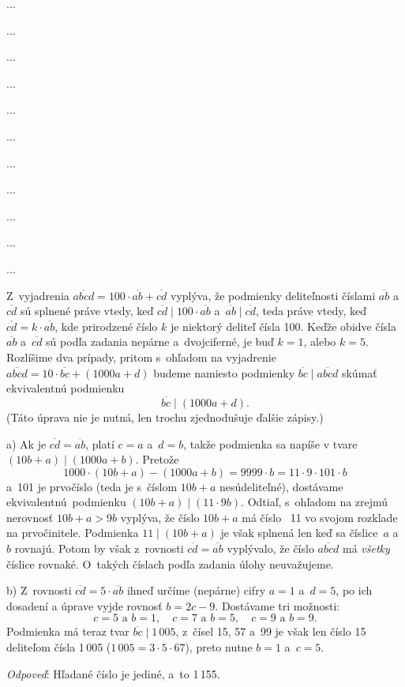 {%
...}

{%
...}

{%
...}

{%
...}

{%
...}

{%
...}

{%
...}

{%
...}

{%
...}

{%
...}

{%
...}

{%
\def\ov{\overline}%
Z~vyjadrenia
$\ov{abcd}=100\cdot\ov{ab}+\ov{cd}$ vyplýva, že podmienky deliteľnosti
číslami $\ov{ab}$ a~$\ov{cd}$ sú
splnené práve vtedy, keď $\ov{cd}\mid100\cdot\ov{ab}$
a~$\ov{ab}\mid\ov{cd}$, teda práve vtedy, keď $\ov{cd}=k\cdot \ov{ab}$,
kde prirodzené číslo $k$ je niektorý deliteľ čísla 100.
Keďže obidve čísla $\ov{ab}$ a~$\ov{cd}$ sú podľa zadania
nepárne a~dvojciferné,
je buď $k=1$, alebo $k=5$. Rozlíšime dva prípady, pritom
s~ohľadom na vyjadrenie $\ov{abcd}=10\cdot\ov{bc}+(1000a+d)$
budeme namiesto podmienky $\ov{bc}\mid\ov{abcd}$ skúmať
ekvivalentnú pod\-mien\-ku
$$
\ov{bc}\mid(1000a+d).  \tag{$\ast$}
$$
(Táto úprava nie je nutná, len trochu zjednodušuje ďalšie zápisy.)

a) Ak je $\ov{cd}=\ov{ab}$, platí $c=a$ a~$d=b$, takže podmienka
\thetag{$\ast$}
sa napíše v tvare $(10b+a)\mid(1000a+b)$. Pretože
$$
1000\cdot(10b+a)-(1000a+b)=9999\cdot b=11\cdot9\cdot101\cdot b
$$
a~101 je prvočíslo (teda je s~číslom $10b+a$ nesúdeliteľné),
dostávame ekvivalentnú~podmienku $(10b+a)\mid(11\cdot9b)$.
Odtiaľ, s~ohľadom na zrejmú nerovnosť $10b+a>9b$ vyplýva,
že číslo $10b+a$ má číslo~ 11 vo svojom rozklade na prvočinitele.
Podmienka $11\mid(10b+a)$ je však splnená
len keď sa číslice~$a$ a~$b$ rovnajú. Potom by však
z~rovnosti  $\ov{cd}=\ov{ab}$ vyplývalo, že číslo $\ov{abcd}$
má {\it všetky\/} číslice rovnaké. O~takých číslach podľa zadania
úlohy neuvažujeme.

b) Z~rovnosti $\ov{cd}=5\cdot\ov{ab}$ ihneď určíme (nepárne) cifry
$a=1$ a~$d=5$, po ich dosadení a úprave vyjde rovnosť
$b=2c-9$. Dostávame tri možnosti:
$$
c=5\text{ a~}b=1,\quad c=7\text{ a~}b=5,\quad
c=9\text{ a~}b=9.
$$
Podmienka \thetag{$\ast$} má teraz tvar $\ov{bc}\mid 1\,005$,
z~čísel 15, 57 a~99
je však len číslo 15 deliteľom čísla 1\,005
($1\,005=3\cdot5\cdot67$), preto nutne $b=1$ a~$c=5$.

\medskip
{\it Odpoveď\/}: Hľadané číslo je jediné, a~to 1\,155.
}

